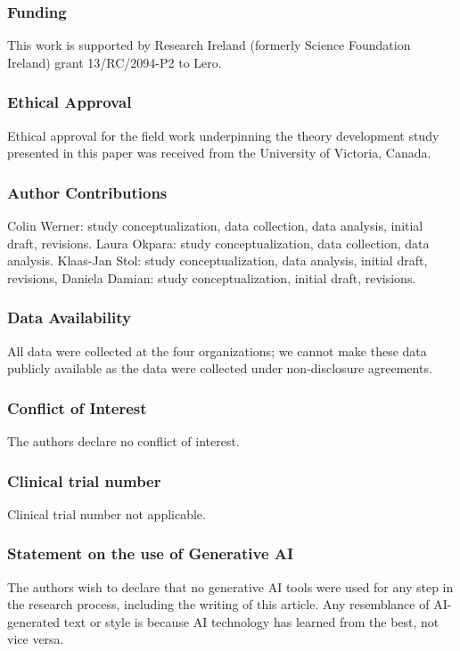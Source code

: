 \documentclass[smallextended]{svjour3}       %
\begin{document}
\subsubsection*{Funding}
This work is supported by Research Ireland (formerly Science Foundation Ireland) grant 13/RC/2094-P2 to Lero.

\subsubsection*{Ethical Approval}
Ethical approval for the field work underpinning the theory development study presented in this paper was received from the University of Victoria, Canada.

\subsubsection*{Author Contributions}
Colin Werner: study conceptualization, data collection, data analysis, initial draft, revisions. Laura Okpara: study conceptualization, data collection, data analysis. Klaas-Jan Stol: study conceptualization, data analysis, initial draft, revisions, Daniela Damian: study conceptualization, initial draft, revisions. 

\subsubsection*{Data Availability}
All data were collected at the four organizations; we cannot make these data publicly available as the data were collected under non-disclosure agreements. 


\subsubsection*{Conflict of Interest}
The authors declare no conflict of interest.

\subsubsection*{Clinical trial number}
Clinical trial number not applicable. 

\subsubsection*{Statement on the use of Generative AI}
The authors wish to declare that no generative AI tools were used for any step in the research process, including the writing of this article. Any resemblance of AI-generated text or style is because AI technology has learned from the best, not vice versa.
\end{document}
